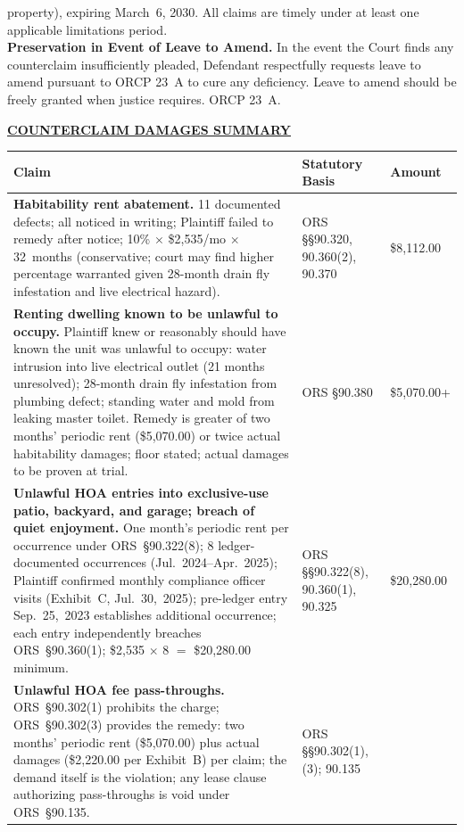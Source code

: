 \documentclass[10pt,letterpaper,oneside]{extarticle}
\newcommand{\CenteredUnderlined}[1]{%
	\begin{center}\underline{\textbf{#1}}\end{center}}
\begin{document}
property), expiring March~6, 2030. All claims are timely
under at least one applicable limitations period.\\
\indent \textbf{Preservation in Event of Leave to Amend.}
In the event the Court finds any counterclaim
insufficiently pleaded, Defendant respectfully requests
leave to amend pursuant to ORCP 23~A to cure any
deficiency. Leave to amend should be freely granted when
justice requires. ORCP 23~A.
\CenteredUnderlined{COUNTERCLAIM DAMAGES SUMMARY}
\begin{longtable}{p{3.3in} p{1.6in} p{.7in}}
	\toprule
	\textbf{Claim} & \textbf{Statutory Basis}
	& \textbf{Amount} \\
	\midrule
	\endhead
	\textbf{Habitability rent abatement.}
	11 documented defects; all noticed in writing;
	Plaintiff failed to remedy after notice; 10\%
	$\times$ \$2,535/mo $\times$ 32~months
	(conservative; court may find higher percentage
	warranted given 28-month drain fly infestation
	and live electrical hazard).
	& ORS \S\S90.320, 90.360(2), 90.370
	& \$8,112.00 \\[12pt]
	\textbf{Renting dwelling known to be unlawful to
		occupy.} Plaintiff knew or reasonably should have
	known the unit was unlawful to occupy: water
	intrusion into live electrical outlet (21 months
	unresolved); 28-month drain fly infestation from
	plumbing defect; standing water and mold from
	leaking master toilet. Remedy is greater of two
	months' periodic rent (\$5,070.00) or twice actual
	habitability damages; floor stated; actual damages
	to be proven at trial.
	& ORS \S90.380
	& \$5,070.00+ \\[12pt]
	\textbf{Unlawful HOA entries into exclusive-use
		patio, backyard, and garage; breach of quiet
		enjoyment.} One month's periodic rent per
	occurrence under ORS~\S90.322(8); 8
	ledger-documented occurrences (Jul.~2024--Apr.~2025);
	Plaintiff confirmed monthly compliance officer
	visits (Exhibit~C, Jul.~30,~2025); pre-ledger
	entry Sep.~25,~2023 establishes additional
	occurrence; each entry independently breaches
	ORS~\S90.360(1); \$2,535 $\times$ 8 $=$
	\$20,280.00 minimum.
	& ORS \S\S90.322(8), 90.360(1), 90.325
	& \$20,280.00 \\[12pt]
	\textbf{Unlawful HOA fee pass-throughs.}
	ORS~\S90.302(1) prohibits the charge;
	ORS~\S90.302(3) provides the remedy: two months'
	periodic rent (\$5,070.00) plus actual damages
	(\$2,220.00 per Exhibit~B) per claim; the demand
	itself is the violation; any lease clause
	authorizing pass-throughs is void under
	ORS~\S90.135.
	& ORS \S\S90.302(1), (3); 90.135

\end{longtable}
\end{document}
